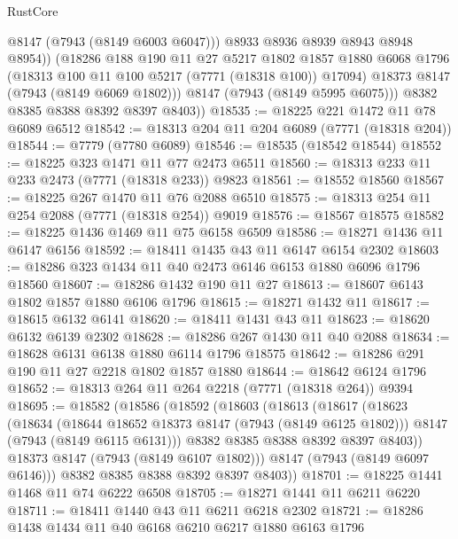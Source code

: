 \begin{lexlean}{RustCore}
\begin{coremodule}
                @8147
                (@7943 (@8149 @6003 @6047)))
              @8933
              @8936
              @8939
              @8943
              @8948
              @8954))
          (@18286
            @188
            @190
            @11
            @27
            @5217
            @1802
            @1857
            @1880
            @6068
            @1796
            (@18313 @100 @11 @100 @5217 (@7771 (@18318 @100)) @17094)
            @18373
            @8147
            (@7943 (@8149 @6069 @1802)))
          @8147
          (@7943 (@8149 @5995 @6075)))
        @8382
        @8385
        @8388
        @8392
        @8397
        @8403))
@18535 := @18225 @221 @1472 @11 @78 @6089 @6512
@18542 := @18313 @204 @11 @204 @6089 (@7771 (@18318 @204))
@18544 := @7779 (@7780 @6089)
@18546 := @18535 (@18542 @18544)
@18552 := @18225 @323 @1471 @11 @77 @2473 @6511
@18560 := @18313 @233 @11 @233 @2473 (@7771 (@18318 @233)) @9823
@18561 := @18552 @18560
@18567 := @18225 @267 @1470 @11 @76 @2088 @6510
@18575 := @18313 @254 @11 @254 @2088 (@7771 (@18318 @254)) @9019
@18576 := @18567 @18575
@18582 := @18225 @1436 @1469 @11 @75 @6158 @6509
@18586 := @18271 @1436 @11 @6147 @6156
@18592 := @18411 @1435 @43 @11 @6147 @6154 @2302
@18603 := @18286 @323 @1434 @11 @40 @2473 @6146 @6153 @1880 @6096 @1796 @18560
@18607 := @18286 @1432 @190 @11 @27
@18613 := @18607 @6143 @1802 @1857 @1880 @6106 @1796
@18615 := @18271 @1432 @11
@18617 := @18615 @6132 @6141
@18620 := @18411 @1431 @43 @11
@18623 := @18620 @6132 @6139 @2302
@18628 := @18286 @267 @1430 @11 @40 @2088
@18634 := @18628 @6131 @6138 @1880 @6114 @1796 @18575
@18642 := @18286 @291 @190 @11 @27 @2218 @1802 @1857 @1880
@18644 := @18642 @6124 @1796
@18652 := @18313 @264 @11 @264 @2218 (@7771 (@18318 @264)) @9394
@18695 := @18582
    (@18586
      (@18592
        (@18603
          (@18613
            (@18617
              (@18623
                (@18634
                  (@18644 @18652 @18373 @8147 (@7943 (@8149 @6125 @1802)))
                  @8147
                  (@7943 (@8149 @6115 @6131)))
                @8382
                @8385
                @8388
                @8392
                @8397
                @8403))
            @18373
            @8147
            (@7943 (@8149 @6107 @1802)))
          @8147
          (@7943 (@8149 @6097 @6146)))
        @8382
        @8385
        @8388
        @8392
        @8397
        @8403))
@18701 := @18225 @1441 @1468 @11 @74 @6222 @6508
@18705 := @18271 @1441 @11 @6211 @6220
@18711 := @18411 @1440 @43 @11 @6211 @6218 @2302
@18721 := @18286 @1438 @1434 @11 @40 @6168 @6210 @6217 @1880 @6163 @1796

\end{coremodule}
\end{lexlean}
